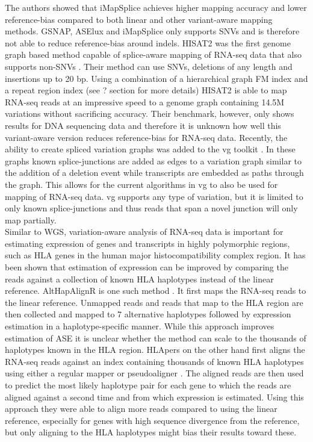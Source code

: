 The authors showed that iMapSplice achieves higher mapping accuracy and lower reference-bias compared to both linear and other variant-aware mapping methods.
GSNAP, ASElux and iMapSplice only supports SNVs and is therefore not able to reduce reference-bias around indels.
HISAT2 was the first genome graph based method capable of splice-aware mapping of RNA-seq data that also supports non-SNVs \cite{Kim_2019}. 
Their method can use SNVs, deletions of any length and insertions up to 20 bp.
Using a combination of a hierarchical graph FM index and a repeat region index (see ? section for more details) HISAT2 is able to map RNA-seq reads at an impressive speed to a genome graph containing 14.5M variations without sacrificing accuracy. 
Their benchmark, however, only shows results for DNA sequencing data and therefore it is unknown how well this variant-aware version reduces reference-bias for RNA-seq data.
Recently, the ability to create spliced variation graphs was added to the vg toolkit \cite{Garrison_2018}. 
In these graphs known splice-junctions are added as edges to a variation graph similar to the addition of a deletion event while transcripts are embedded as paths through the graph. 
This allows for the current algorithms in vg to also be used for mapping of RNA-seq data. 
vg supports any type of variation, but it is limited to only known splice-junctions and thus reads that span a novel junction will only map partially. \\

Similar to WGS, variation-aware analysis of RNA-seq data is important for estimating expression of genes and transcripts in highly polymorphic regions, such as HLA genes in the human major histocompatibility complex region. 
It has been shown that estimation of expression can be improved by comparing the reads against a collection of known HLA haplotypes instead of the linear reference. 
AltHapAlignR is one such method \cite{Lee2018-mm}. It first maps the RNA-seq reads to the linear reference. Unmapped reads and reads that map to the HLA region are then collected and mapped to 7 alternative haplotypes followed by expression estimation in a haplotype-specific manner. 
While this approach improves estimation of ASE it is unclear whether the method can scale to the thousands of haplotypes known in the HLA region.
HLApers on the other hand first aligns the RNA-seq reads against an index containing thousands of known HLA haplotypes using either a regular mapper or pseudoaligner \cite{Aguiar2019-fy}.
The aligned reads are then used to predict the most likely haplotype pair for each gene to which the reads are aligned against a second time and from which expression is estimated.  
Using this approach they were able to align more reads compared to using the linear reference, especially for genes with high sequence divergence from the reference, but only aligning to the HLA haplotypes might bias their results toward these. \\

